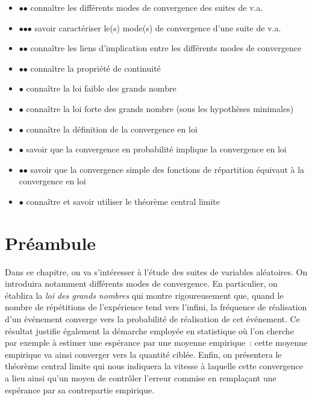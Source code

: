\label{IV-convergence-et-loi-des-grands-nombres}

\begin{itemize}
\tightlist
\item
  $\mathord{\bullet}\mathord{\bullet}$ connaître les différents modes de
  convergence des suites de v.a.
\item
  $\mathord{\bullet}\mathord{\bullet}\mathord{\bullet}$ savoir
  caractériser le(s) mode(s) de convergence d'une suite de v.a.
\item
  $\mathord{\bullet}\mathord{\bullet}$ connaître les liens d'implication
  entre les différents modes de convergence
\item
  $\mathord{\bullet}\mathord{\bullet}$ connaître la propriété de
  continuité
\item
  $\mathord{\bullet}$ connaître la loi faible des grands nombre
\item
  $\mathord{\bullet}$ connaître la loi forte des grands nombre (sous les
  hypothèses minimales)
\end{itemize}

\label{IV-convergence-en-loi-et-thuxe9oruxe8me-central-limite}

\begin{itemize}
\tightlist
\item
  $\mathord{\bullet}$ connaître la définition de la convergence en loi
\item
  $\mathord{\bullet}$ savoir que la convergence en probabilité implique
  la convergence en loi
\item
  $\mathord{\bullet}\mathord{\bullet}$ savoir que la convergence simple
  des fonctions de répartition équivaut à la convergence en loi
\item
  $\mathord{\bullet}$ connaître et savoir utiliser le théorème central
  limite
\end{itemize}

\chapter{Préambule}\label{IV-pruxe9ambule-1}

Dans ce chapitre, on va s'intéresser à l'étude des suites de variables
aléatoires. On introduira notamment différents modes de convergence. En
particulier, on établira la \emph{loi des grands nombres} qui montre
rigoureusement que, quand le nombre de répétitions de l'expérience tend
vers l'infini, la fréquence de réalisation d'un événement converge vers
la probabilité de réalisation de cet événement. Ce résultat justifie
également la démarche employée en statistique où l'on cherche par
exemple à estimer une espérance par une moyenne empirique~: cette
moyenne empirique va ainsi converger vers la quantité ciblée. Enfin, on
présentera le théorème central limite qui nous indiquera la vitesse à
laquelle cette convergence a lieu ainsi qu'un moyen de contrôler
l'erreur commise en remplaçant une espérance par sa contrepartie
empirique.

